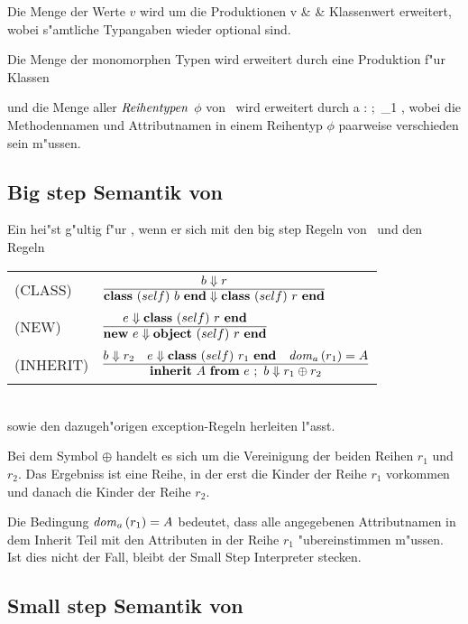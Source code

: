 Die Menge \notation{\Val} der Werte $v$ wird um die Produktionen
\bgram
v \is {}                                         & & \mbox{Klassenwert}
\egram
erweitert, wobei s"amtliche Typangaben wieder optional sind.

Die Menge der monomorphen Typen \notation{\Type} wird erweitert durch eine Produktion f"ur Klassen
\bgram
\tau \is \classtype{\tau}{\phi}
\egram

und die Menge \notation{$\TypeR$} aller ${\text{\it Reihentypen\/}}$ $\phi$ von \LTWOC\ wird erweitert durch
\bgram
\phi \is a : \tau;\ \phi_1
\egram
, wobei die Methodennamen und Attributnamen in einem Reihentyp $\phi$ paarweise
verschieden sein m"ussen.


\subsection{Big step Semantik von \LTWOC}

Ein  hei"st g"ultig f"ur \LTWOC, wenn er sich mit den big step Regeln von \LTWOO\ und den Regeln\\[3mm]
  \begin{tabular}{ll}
    \mbox{(CLASS)}       & $\regel{b \eval r}
                                  {\class{self}{b} \eval \class{self}{r}}$ \\[5mm]
    \mbox{(NEW)}         & $\regel{e \eval \class{self}{r}}
                                  {\new{e} \eval \object{self}{r}}$ \\[5mm]
    \mbox{(INHERIT)}     & $\regel{b \eval r_2 \quad  e \eval \class{self}{r_1} \quad \doma{r_1} = A}
                                  {\inherit{A}{e}{b} \eval r_1 \oplus r_2}$
  \end{tabular}\\[7mm]
sowie den dazugeh"origen exception-Regeln herleiten l"asst.

Bei dem Symbol $\oplus$ handelt es sich um die Vereinigung der beiden Reihen $r_1$ und $r_2$.
Das Ergebniss ist eine Reihe, in der erst die Kinder der Reihe $r_1$ vorkommen und danach
die Kinder der Reihe $r_2$.

Die Bedingung ${\text{\it dom\/}}_a\,(r_1) = A$ bedeutet, dass alle angegebenen
Attributnamen in dem Inherit Teil mit den Attributen in der Reihe $r_1$ "ubereinstimmen m"ussen.
Ist dies nicht der Fall, bleibt der Small Step Interpreter stecken.

\subsection{Small step Semantik von \LTWOC}

